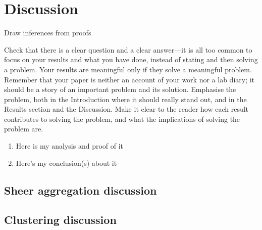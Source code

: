 \chapter{Discussion} \label{Chapter: Discussion}

Draw inferences from proofs

Check that there is a clear question and a clear answer—it is all too common to focus on your results and what you have done, instead of stating and then solving a problem. Your results are meaningful only if they solve a meaningful problem. Remember that your paper is neither an account of your work nor a lab diary; it should be a story of an important problem and its solution. Emphasise the problem, both in the Introduction where it should really stand out, and in the Results section and the Discussion. Make it clear to the reader how each result contributes to solving the problem, and what the implications of solving the problem are.

\begin{enumerate}
\item Here is my analysis and proof of it
\item Here's my conclusion(s) about it
\end{enumerate}

\section{Sheer aggregation discussion}

\section{Clustering discussion}